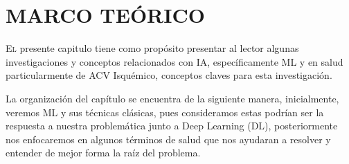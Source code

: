 \doublespacing
\chapter{MARCO TEÓRICO}
\lettrine[lines=4, slope=0.2em, findent=0.2em, nindent=0.6em]{E}l presente capitulo tiene como propósito presentar al lector algunas investigaciones y conceptos relacionados con IA, específicamente ML y en salud particularmente de ACV Isquémico, conceptos claves para esta investigación. \\
\par La organización del capítulo se encuentra de la siguiente manera, inicialmente, veremos ML y sus técnicas clásicas, pues consideramos estas podrían ser la respuesta a nuestra problemática junto a Deep Learning (DL), posteriormente nos enfocaremos en algunos términos de salud que nos ayudaran a resolver y entender de mejor forma la raíz del problema. 
\\

\doublespacing
